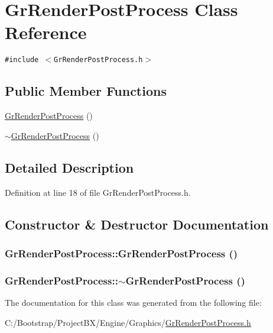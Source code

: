\hypertarget{class_gr_render_post_process}{
\section{GrRenderPostProcess Class Reference}
\label{class_gr_render_post_process}
}
{\tt \#include $<$GrRenderPostProcess.h$>$}

\subsection*{Public Member Functions}
\begin{CompactItemize}
\item 
\hyperlink{class_gr_render_post_process_0c522acd1771c8e095601e630205ec15}{GrRenderPostProcess} ()
\item 
\hyperlink{class_gr_render_post_process_846e0fa5d470a2ba91be328699c40656}{$\sim$GrRenderPostProcess} ()
\end{CompactItemize}


\subsection{Detailed Description}


Definition at line 18 of file GrRenderPostProcess.h.

\subsection{Constructor \& Destructor Documentation}
\hypertarget{class_gr_render_post_process_0c522acd1771c8e095601e630205ec15}{
\subsubsection[{GrRenderPostProcess}]{\setlength{\rightskip}{0pt plus 5cm}GrRenderPostProcess::GrRenderPostProcess ()}}
\label{class_gr_render_post_process_0c522acd1771c8e095601e630205ec15}


\hypertarget{class_gr_render_post_process_846e0fa5d470a2ba91be328699c40656}{
\subsubsection[{$\sim$GrRenderPostProcess}]{\setlength{\rightskip}{0pt plus 5cm}GrRenderPostProcess::$\sim$GrRenderPostProcess ()}}
\label{class_gr_render_post_process_846e0fa5d470a2ba91be328699c40656}




The documentation for this class was generated from the following file:\begin{CompactItemize}
\item 
C:/Bootstrap/ProjectBX/Engine/Graphics/\hyperlink{_gr_render_post_process_8h}{GrRenderPostProcess.h}\end{CompactItemize}

